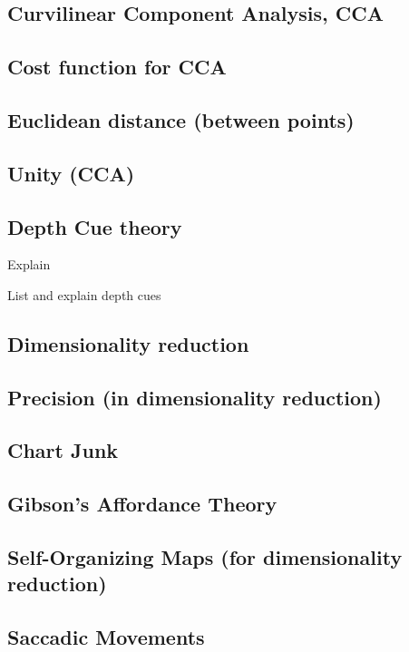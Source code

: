 \documentclass[a4paper]{article}
\begin{document}
\subsection{Curvilinear Component Analysis, CCA}

\subsection{Cost function for CCA}

\subsection{Euclidean distance (between points)}

\subsection{Unity (CCA)}

\subsection{Depth Cue theory}
Explain

List and explain depth cues

\subsection{Dimensionality reduction}

\subsection{Precision (in dimensionality reduction)}

\subsection{Chart Junk}

\subsection{Gibson's Affordance Theory}

\subsection{Self-Organizing Maps (for dimensionality reduction)}

\subsection{Saccadic Movements}
\end{document}
